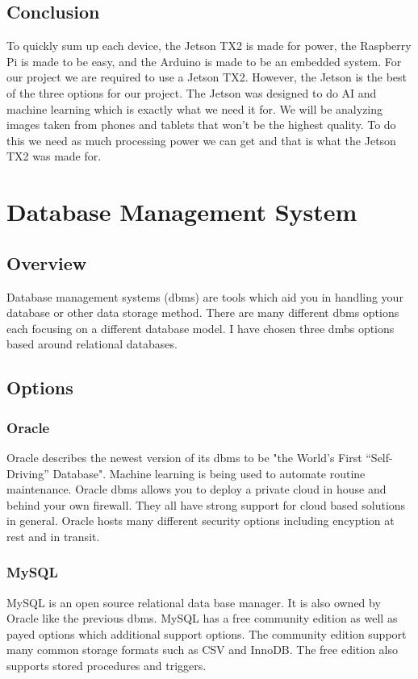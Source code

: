 \documentclass[onecolumn, draftclsnofoot,10pt, compsoc]{IEEEtran}
\begin{document}
	\subsection{Conclusion}
		To quickly sum up each device, the Jetson TX2 is made for power, the Raspberry Pi is made to be easy, and the Arduino is made to be an embedded system.
		For our project we are required to use a Jetson TX2.
		However, the Jetson is the best of the three options for our project.
		The Jetson was designed to do AI and machine learning which is exactly what we need it for.
		We will be analyzing images taken from phones and tablets that won't be the highest quality.
		To do this we need as much processing power we can get and that is what the Jetson TX2 was made for.

\section{Database Management System}
	\subsection{Overview}
		Database management systems (dbms) are tools which aid you in handling your database or other data storage method.
		There are many different dbms options each focusing on a different database model.
		I have chosen three dmbs options based around relational databases.

	\subsection{Options}
		\subsubsection{Oracle}
			Oracle describes the newest version of its dbms to be "the World’s First “Self-Driving” Database".\cite{oracle_index}
			Machine learning is being used to automate routine maintenance.
			Oracle dbms allows you to deploy a private cloud in house and behind your own firewall.
			They all have strong support for cloud based solutions in general\cite{oracle_data_admin}.
			Oracle hosts many different security options including encyption at rest and in transit\cite{oracle_security}.

		\subsubsection{MySQL}
			MySQL is an open source relational data base manager.
			It is also owned by Oracle like the previous dbms.
			MySQL has a free community edition as well as payed options which additional support options\cite{mysql_products}.
			The community edition support many common storage formats such as CSV and InnoDB.
			The free edition also supports stored procedures and triggers\cite{mysql_community}.
\end{document}
